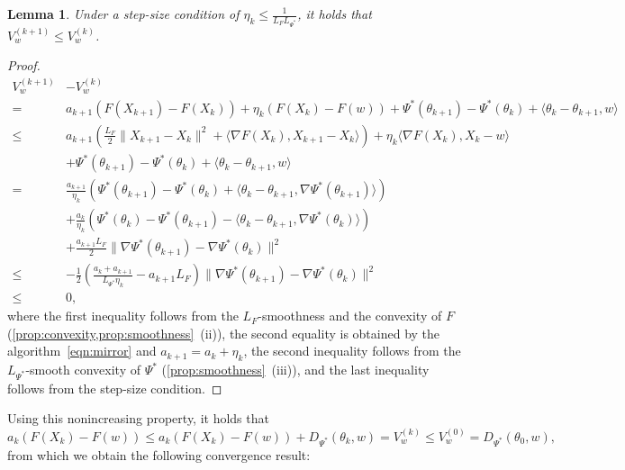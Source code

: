 \documentclass[11pt,a4paper]{article}
\theoremstyle{definition}
\theoremstyle{plain}
\newtheorem{lem}[lem]{Lemma}
\begin{document}
\begin{lem}
    Under a step-size condition of $\eta_k \le \frac1{L_FL_{\Psi^\ast}}$, it holds that $V_w^{(k + 1)} \le V_w^{(k)}$.
\end{lem}
\begin{proof}
    \begin{align*}
        V_w^{(k + 1)}& - V_w^{(k)}\\
        =\ & a_{k + 1}(F(X_{k + 1}) - F(X_k)) + \eta_k(F(X_k) - F(w)) + \Psi^\ast(\theta_{k + 1}) - \Psi^\ast(\theta_k) + \langle\theta_k - \theta_{k + 1}, w\rangle\\
        \le\ &a_{k + 1}\left(\frac{L_F}2\|X_{k + 1} - X_k\|^2 + \langle\nabla F(X_k), X_{k + 1} - X_k\rangle\right) + \eta_k\langle\nabla F(X_k), X_k - w\rangle\\
        & + \Psi^\ast(\theta_{k + 1}) - \Psi^\ast(\theta_k) + \langle\theta_k - \theta_{k + 1}, w\rangle\\
        =\ &\frac{a_{k + 1}}{\eta_k}\left(\Psi^\ast(\theta_{k + 1}) - \Psi^\ast(\theta_k) +\langle\theta_k - \theta_{k + 1}, \nabla\Psi^\ast(\theta_{k + 1})\rangle\right)\\
        & + \frac{a_k}{\eta_k}\left(\Psi^\ast(\theta_k) - \Psi^\ast(\theta_{k + 1}) - \langle\theta_k - \theta_{k + 1}, \nabla\Psi^\ast(\theta_k)\rangle\right)\\
        & + \frac{a_{k + 1}L_F}2\|\nabla\Psi^\ast(\theta_{k + 1}) - \nabla\Psi^\ast(\theta_k)\|^2\\
        \le\ &-\frac12\left(\frac{a_k + a_{k + 1}}{L_{\Psi^\ast}\eta_k} - a_{k + 1}L_F\right)\|\nabla\Psi^\ast(\theta_{k + 1}) - \nabla\Psi^\ast(\theta_k)\|^2\\
        \le\ &0,
    \end{align*}
    where the first inequality follows from the $L_F$-smoothness and the convexity of $F$ (\cref{prop:convexity,prop:smoothness}~(ii)), the second equality is obtained by the algorithm~\eqref{eqn:mirror} and $a_{k + 1} = a_k + \eta_k$, the second inequality follows from the $L_{\Psi^\ast}$-smooth convexity of $\Psi^\ast$ (\cref{prop:smoothness}~(iii)), and the last inequality follows from the step-size condition.
\end{proof}
Using this nonincreasing property, it holds that
\[
    a_k(F(X_k) - F(w)) \le a_k(F(X_k) - F(w)) + D_{\Psi^\ast}(\theta_k, w) = V_w^{(k)} \le V_w^{(0)} = D_{\Psi^\ast}(\theta_0, w),
\]
from which we obtain the following convergence result:
\end{document}

